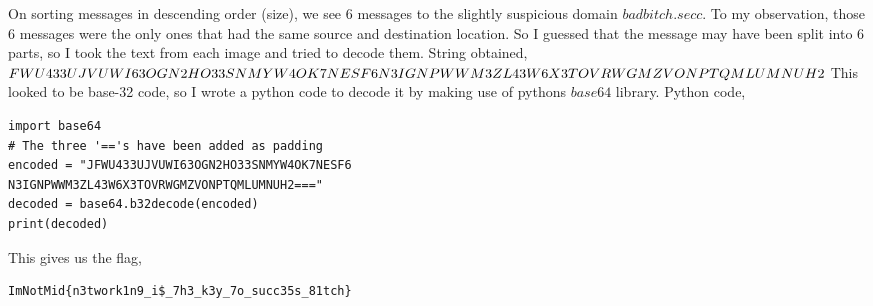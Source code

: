 \documentclass{article}
\begin{document}
\newline On sorting messages in descending order (size), we see 6 messages to the slightly suspicious domain $badbitch.secc$. To my observation, those 6 messages were the only ones that had the same source and destination location. So I guessed that the message may have been split into 6 parts, so I took the text from each image and tried to decode them. \newline \newline 
String obtained, $FWU433UJVUWI63OGN2HO33SNMYW4OK7NESF6\\N3IGNPWWM3ZL43W6X3TOVRWGMZVONPTQMLUMNUH2$\newline \newline 
This looked to be base-32 code, so I wrote a python code to decode it by making use of pythons $base64$ library. Python code,
\begin{verbatim}
import base64
# The three '=='s have been added as padding
encoded = "JFWU433UJVUWI63OGN2HO33SNMYW4OK7NESF6
N3IGNPWWM3ZL43W6X3TOVRWGMZVONPTQMLUMNUH2==="
decoded = base64.b32decode(encoded)
print(decoded)
\end{verbatim}
This gives us the flag, 
\begin{verbatim}
ImNotMid{n3twork1n9_i$_7h3_k3y_7o_succ35s_81tch}
\end{verbatim}
\end{document}
